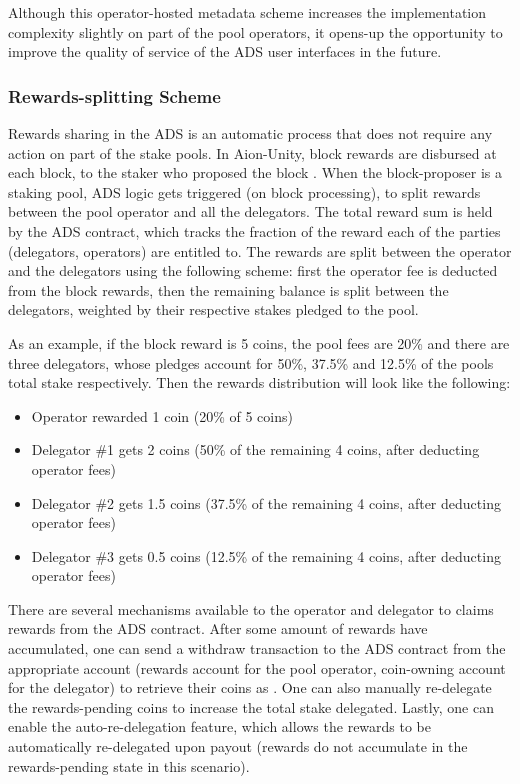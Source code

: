 Although this operator-hosted metadata scheme increases the implementation complexity slightly on part of the pool operators, it opens-up the opportunity to improve the quality of service of the ADS user interfaces in the future. 

\subsubsection{Rewards-splitting Scheme} \label{rewards_splitting}

Rewards sharing in the ADS is an automatic process that does not require any action on part of the stake pools. In Aion-Unity, block rewards are disbursed at each block, to the staker who proposed the block \cite{WZS19}. When the block-proposer is a staking pool, ADS logic gets triggered (on block processing), to split rewards between the pool operator and all the delegators. The total reward sum is held by the ADS contract, which tracks the fraction of the reward each of the parties (delegators, operators) are entitled to. The rewards are split between the operator and the delegators using the following scheme: first the operator fee is deducted from the block rewards, then the remaining balance is split between the delegators, weighted by their respective stakes pledged to the pool.

As an example, if the block reward is 5 coins, the pool fees are 20\% and there are three delegators, whose pledges account for 50\%, 37.5\% and 12.5\% of the pools total stake respectively. Then the rewards distribution will look like the following: 

\begin{itemize}[label=--,nosep]
    \item Operator rewarded 1 coin (20\% of 5 coins)
    \item Delegator \#1 gets 2 coins (50\% of the remaining 4 coins, after deducting operator fees)
    \item Delegator \#2 gets 1.5 coins (37.5\% of the remaining 4 coins, after deducting operator fees)
    \item Delegator \#3 gets 0.5 coins (12.5\% of the remaining 4 coins, after deducting operator fees)
\end{itemize}

There are several mechanisms available to the operator and delegator to claims rewards from the ADS contract. After some amount of rewards have accumulated, one can send a withdraw transaction to the ADS contract from the appropriate account (rewards account for the pool operator, coin-owning account for the delegator) to retrieve their coins as . One can also manually re-delegate the rewards-pending coins to increase the total stake delegated. Lastly, one can enable the auto-re-delegation feature, which allows the rewards to be automatically re-delegated upon payout (rewards do not accumulate in the rewards-pending state in this scenario). 

